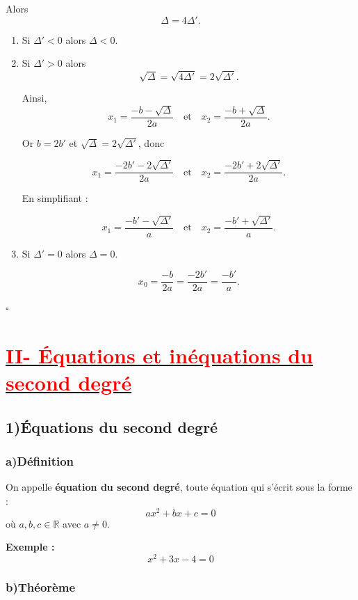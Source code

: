 \documentclass[12pt,a4paper]{article}
\begin{document}
Alors
\[
\Delta=4\Delta'.
\]

\medskip

\begin{enumerate}
\item[(i)] Si $\Delta'<0$ alors $\Delta<0$.

\item[(ii)] Si $\Delta'>0$ alors
\[
\sqrt{\Delta}=\sqrt{4\Delta'}=2\sqrt{\Delta'}.
\]

Ainsi,
\[
x_1=\frac{-b-\sqrt{\Delta}}{2a}
\quad \text{et} \quad
x_2=\frac{-b+\sqrt{\Delta}}{2a}.
\]

Or $b=2b'$ et $\sqrt{\Delta}=2\sqrt{\Delta'}$, donc

\[
x_1=\frac{-2b'-2\sqrt{\Delta'}}{2a}
\quad \text{et} \quad
x_2=\frac{-2b'+2\sqrt{\Delta'}}{2a}.
\]

En simplifiant :

\[
x_1=\frac{-b'-\sqrt{\Delta'}}{a}
\quad \text{et} \quad
x_2=\frac{-b'+\sqrt{\Delta'}}{a}.
\]

\item[(iii)] Si $\Delta'=0$ alors $\Delta=0$.

\[
x_0=\frac{-b}{2a}
=\frac{-2b'}{2a}
=\frac{-b'}{a}.
\]

\end{enumerate}

\hfill $\square$
\section*{\underline{\textcolor{red}{II- Équations et inéquations du second degré}}}

\subsection*{1)\quad Équations du second degré}

\subsubsection*{a)\quad Définition}

On appelle \textbf{équation du second degré}, toute équation qui s'écrit sous la forme :
\[
ax^2 + bx + c = 0
\]
où $a,b,c \in \mathbb{R}$ avec $a \neq 0$.

\textbf{Exemple :}
\[
x^2 + 3x - 4 = 0
\]

\subsubsection*{b)\quad Théorème}
\end{document}
